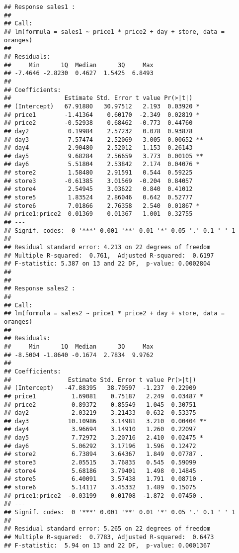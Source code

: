 \documentclass[
]{book}
\begin{document}
\begin{verbatim}
## Response sales1 :
## 
## Call:
## lm(formula = sales1 ~ price1 * price2 + day + store, data = oranges)
## 
## Residuals:
##     Min      1Q  Median      3Q     Max 
## -7.4646 -2.8230  0.4627  1.5425  6.8493 
## 
## Coefficients:
##               Estimate Std. Error t value Pr(>|t|)   
## (Intercept)   67.91880   30.97512   2.193  0.03920 * 
## price1        -1.41364    0.60170  -2.349  0.02819 * 
## price2        -0.52938    0.68462  -0.773  0.44760   
## day2           0.19984    2.57232   0.078  0.93878   
## day3           7.57474    2.52069   3.005  0.00652 **
## day4           2.90480    2.52012   1.153  0.26143   
## day5           9.68284    2.56659   3.773  0.00105 **
## day6           5.51804    2.53842   2.174  0.04076 * 
## store2         1.58480    2.91591   0.544  0.59225   
## store3        -0.61385    3.01569  -0.204  0.84057   
## store4         2.54945    3.03622   0.840  0.41012   
## store5         1.83524    2.86046   0.642  0.52777   
## store6         7.01866    2.76358   2.540  0.01867 * 
## price1:price2  0.01369    0.01367   1.001  0.32755   
## ---
## Signif. codes:  0 '***' 0.001 '**' 0.01 '*' 0.05 '.' 0.1 ' ' 1
## 
## Residual standard error: 4.213 on 22 degrees of freedom
## Multiple R-squared:  0.761,  Adjusted R-squared:  0.6197 
## F-statistic: 5.387 on 13 and 22 DF,  p-value: 0.0002804
## 
## 
## Response sales2 :
## 
## Call:
## lm(formula = sales2 ~ price1 * price2 + day + store, data = oranges)
## 
## Residuals:
##     Min      1Q  Median      3Q     Max 
## -8.5004 -1.8640 -0.1674  2.7834  9.9762 
## 
## Coefficients:
##                Estimate Std. Error t value Pr(>|t|)   
## (Intercept)   -47.88395   38.70597  -1.237  0.22909   
## price1          1.69081    0.75187   2.249  0.03487 * 
## price2          0.89372    0.85549   1.045  0.30751   
## day2           -2.03219    3.21433  -0.632  0.53375   
## day3           10.10986    3.14981   3.210  0.00404 **
## day4            3.96694    3.14910   1.260  0.22097   
## day5            7.72972    3.20716   2.410  0.02475 * 
## day6            5.06292    3.17196   1.596  0.12472   
## store2          6.73894    3.64367   1.849  0.07787 . 
## store3          2.05515    3.76835   0.545  0.59099   
## store4          5.68186    3.79401   1.498  0.14845   
## store5          6.40091    3.57438   1.791  0.08710 . 
## store6          5.14117    3.45332   1.489  0.15075   
## price1:price2  -0.03199    0.01708  -1.872  0.07450 . 
## ---
## Signif. codes:  0 '***' 0.001 '**' 0.01 '*' 0.05 '.' 0.1 ' ' 1
## 
## Residual standard error: 5.265 on 22 degrees of freedom
## Multiple R-squared:  0.7783, Adjusted R-squared:  0.6473 
## F-statistic:  5.94 on 13 and 22 DF,  p-value: 0.0001367
\end{verbatim}
\end{document}

